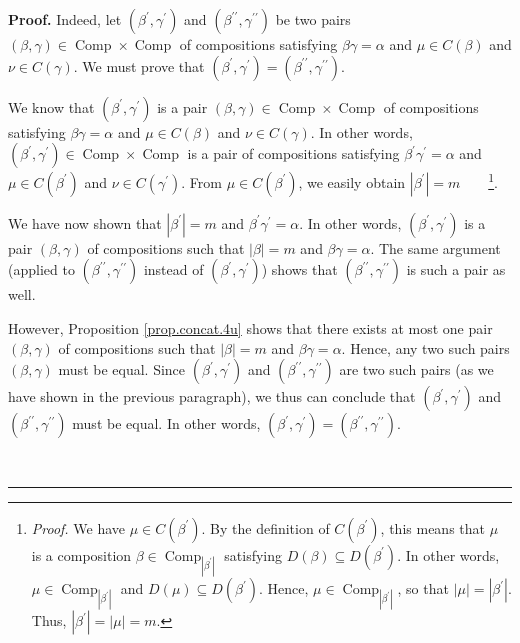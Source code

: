 \documentclass[numbers=enddot,12pt,final,onecolumn,notitlepage]{scrartcl}%
\theoremstyle{definition}
\newenvironment{proof}[1][Proof]{\noindent\textbf{#1.} }{\ \rule{0.5em}{0.5em}}
\begin{document}
\begin{proof}
Indeed, let $\left(  \beta^{\prime},\gamma^{\prime}\right)  $ and $\left(
\beta^{\prime\prime},\gamma^{\prime\prime}\right)  $ be two pairs $\left(
\beta,\gamma\right)  \in\operatorname*{Comp}\times\operatorname*{Comp}$ of
compositions satisfying $\beta\gamma=\alpha$ and $\mu\in C\left(
\beta\right)  $ and $\nu\in C\left(  \gamma\right)  $. We must prove that
$\left(  \beta^{\prime},\gamma^{\prime}\right)  =\left(  \beta^{\prime\prime
},\gamma^{\prime\prime}\right)  $.

We know that $\left(  \beta^{\prime},\gamma^{\prime}\right)  $ is a pair
$\left(  \beta,\gamma\right)  \in\operatorname*{Comp}\times
\operatorname*{Comp}$ of compositions satisfying $\beta\gamma=\alpha$ and
$\mu\in C\left(  \beta\right)  $ and $\nu\in C\left(  \gamma\right)  $. In
other words, $\left(  \beta^{\prime},\gamma^{\prime}\right)  \in
\operatorname*{Comp}\times\operatorname*{Comp}$ is a pair of compositions
satisfying $\beta^{\prime}\gamma^{\prime}=\alpha$ and $\mu\in C\left(
\beta^{\prime}\right)  $ and $\nu\in C\left(  \gamma^{\prime}\right)  $. From
$\mu\in C\left(  \beta^{\prime}\right)  $, we easily obtain $\left\vert
\beta^{\prime}\right\vert =m$\ \ \ \ \footnote{\textit{Proof.} We have $\mu\in
C\left(  \beta^{\prime}\right)  $. By the definition of $C\left(
\beta^{\prime}\right)  $, this means that $\mu$ is a composition $\beta
\in\operatorname*{Comp}\nolimits_{\left\vert \beta^{\prime}\right\vert }$
satisfying $D\left(  \beta\right)  \subseteq D\left(  \beta^{\prime}\right)
$. In other words, $\mu\in\operatorname*{Comp}\nolimits_{\left\vert
\beta^{\prime}\right\vert }$ and $D\left(  \mu\right)  \subseteq D\left(
\beta^{\prime}\right)  $. Hence, $\mu\in\operatorname*{Comp}%
\nolimits_{\left\vert \beta^{\prime}\right\vert }$, so that $\left\vert
\mu\right\vert =\left\vert \beta^{\prime}\right\vert $. Thus, $\left\vert
\beta^{\prime}\right\vert =\left\vert \mu\right\vert =m$.}.

We have now shown that $\left\vert \beta^{\prime}\right\vert =m$ and
$\beta^{\prime}\gamma^{\prime}=\alpha$. In other words, $\left(  \beta
^{\prime},\gamma^{\prime}\right)  $ is a pair $\left(  \beta,\gamma\right)  $
of compositions such that $\left\vert \beta\right\vert =m$ and $\beta
\gamma=\alpha$. The same argument (applied to $\left(  \beta^{\prime\prime
},\gamma^{\prime\prime}\right)  $ instead of $\left(  \beta^{\prime}%
,\gamma^{\prime}\right)  $) shows that $\left(  \beta^{\prime\prime}%
,\gamma^{\prime\prime}\right)  $ is such a pair as well.

However, Proposition \ref{prop.concat.4u} shows that there exists at most one
pair $\left(  \beta,\gamma\right)  $ of compositions such that $\left\vert
\beta\right\vert =m$ and $\beta\gamma=\alpha$. Hence, any two such pairs
$\left(  \beta,\gamma\right)  $ must be equal. Since $\left(  \beta^{\prime
},\gamma^{\prime}\right)  $ and $\left(  \beta^{\prime\prime},\gamma
^{\prime\prime}\right)  $ are two such pairs (as we have shown in the previous
paragraph), we thus can conclude that $\left(  \beta^{\prime},\gamma^{\prime
}\right)  $ and $\left(  \beta^{\prime\prime},\gamma^{\prime\prime}\right)  $
must be equal. In other words, $\left(  \beta^{\prime},\gamma^{\prime}\right)
=\left(  \beta^{\prime\prime},\gamma^{\prime\prime}\right)  $.


\end{proof}
\end{document}
